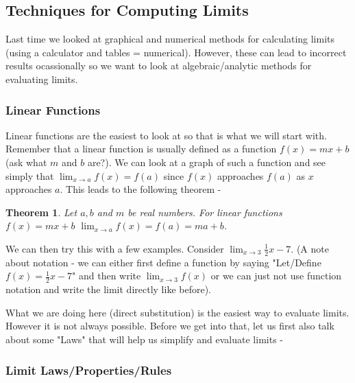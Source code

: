 \documentclass[12pt,reqno]{article}
\newtheorem{Theorem}{Theorem}
\theoremstyle{definition}
\begin{document}
\subsection{Techniques for Computing Limits}

Last time we looked at graphical and numerical methods for calculating limits (using a calculator and tables = numerical). However, these can lead to incorrect results ocassionally so we want to look at algebraic/analytic methods for evaluating limits. 

\subsubsection{Linear Functions}

Linear functions are the easiest to look at so that is what we will start with. Remember that a linear function is usually defined as a function $f(x) = mx + b$ (ask what $m$ and $b$ are?). We can look at a graph of such a function and see simply that $\lim_{x \to a} f(x)  = f(a)$ since $f(x)$ approaches $f(a)$ as $x$ approaches $a$. This leads to the following theorem - 
\begin{Theorem}
	Let $a, b$ and $m$ be real numbers. For linear functions $f(x) = mx + b$ $\lim_{x \to a}f(x) =f(a) = ma + b$. 
\end{Theorem}

We can then try this with a few examples. Consider $\lim_{x \to 3} \frac{1}{2} x - 7. $ (A note about notation - we can either first define a function by saying "Let/Define $f(x) = \frac{1}{2} x - 7$" and then write $\lim_{x\to 3} f(x)$ or we can just not use function notation and write the limit directly like before). 

What we are doing here (direct substitution) is the easiest way to evaluate limits. However it is not always possible. Before we get into that, let us first also talk about some "Laws" that will help us simplify and evaluate limits -
\subsubsection{Limit Laws/Properties/Rules}
\end{document}
